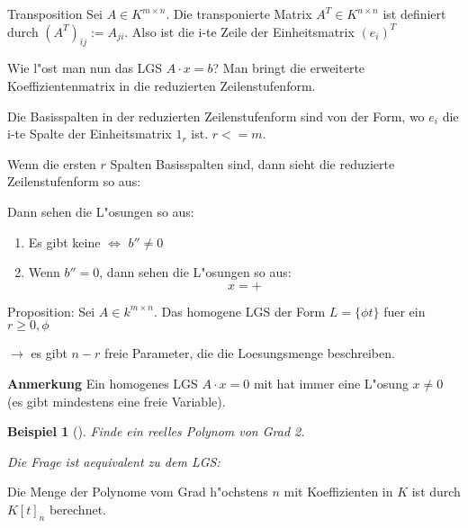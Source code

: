 \documentclass[11pt]{article}
\newtheorem{exa}{Beispiel}[section]
\begin{document}
\begin{definition}{Transposition}{}
Sei \(A\in K^{m\times n}\). Die transponierte Matrix \(A^{T}\in K^{n\times n}\) ist
definiert durch \((A^T)_{ij}:=A_{ji}\). Also ist die i-te Zeile der Einheitsmatrix \((e_i)^T\)
\end{definition}

Wie l"ost man nun das LGS \(A\cdot x=b\)? Man bringt die erweiterte
Koeffizientenmatrix in die reduzierten Zeilenstufenform.

\begin{relation}
Die Basisspalten in der reduzierten Zeilenstufenform sind von der Form, wo \(e_i\)
die i-te Spalte der Einheitsmatrix \(1_r\) ist. \(r <= m\).
\end{relation}

Wenn die ersten \(r\) Spalten Basisspalten sind, dann sieht die reduzierte
Zeilenstufenform so aus:


Dann sehen die L"osungen so aus:
\begin{relation}
\begin{enumerate}
\item Es gibt keine \(\iff\) \(b''\not= 0\)
\item Wenn \(b''=0\), dann sehen die L"osungen so aus: \[x=+\]
\end{enumerate}
\end{relation}

Proposition: Sei \(A\in k^{m\times n}\). Das homogene LGS der Form \(L=\{\phi
t \}\) fuer ein \(r\geq 0, \phi\)

\(\rightarrow\) es gibt \(n-r\) freie Parameter, die die Loesungsmenge beschreiben.

\textbf{Anmerkung} Ein homogenes LGS \(A\cdot x=0\) mit  hat immer eine L"osung \(x\not=
0\) (es gibt mindestens eine freie Variable).


\begin{exa}[] \label{}
Finde ein reelles Polynom von Grad 2.

Die Frage ist aequivalent zu dem LGS:
\end{exa}

\begin{definition}{}{}
Die Menge der Polynome vom Grad h"ochstens \(n\) mit Koeffizienten in \(K\) ist
durch \(K[t]_n\) berechnet.
\end{definition}
\end{document}
